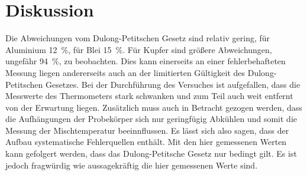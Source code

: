 \section{Diskussion}
\label{sec:Diskussion}
Die Abweichungen vom Dulong-Petitschen Gesetz sind relativ gering, für Aluminium \SI{12}{\percent}, für Blei \SI{15}{\percent}.
Für Kupfer sind größere Abweichungen, ungefähr \SI{94}{\percent}, zu beobachten.
Dies kann einerseits an einer fehlerbehafteten Messung liegen andererseits auch an der limitierten Gültigkeit des Dulong-Petitschen Gesetzes.
Bei der Durchführung des Versuches ist aufgefallen, 
dass die Messwerte des Thermometers stark schwanken und zum Teil auch weit entfernt von der Erwartung liegen.
Zusätzlich muss auch in Betracht gezogen werden, dass die Aufhängungen der Probekörper sich nur geringfügig Abkühlen 
und somit die Messung der Mischtemperatur beeinnflussen.
Es lässt sich also sagen, dass der Aufbau systematische Fehlerquellen enthält.
Mit den hier gemessenen Werten kann gefolgert werden, dass das Dulong-Petitsche Gesetz nur bedingt gilt.
Es ist jedoch fragwürdig wie aussagekräftig die hier gemessenen Werte sind.
